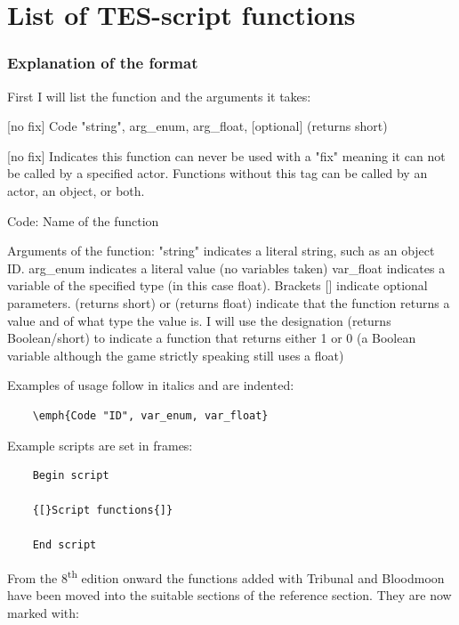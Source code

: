 \section{List of TES-script functions}

\hypertarget{explanation-of-the-format}{%
\subsubsection{Explanation of the
format}\label{explanation-of-the-format}}

First I will list the function and the arguments it takes:

	{[}no fix{]} Code "string", arg\_enum, arg\_float, {[}optional{]}
	(returns short)

{[}no fix{]} Indicates this function can never be used with a "fix"
meaning it can not be called by a specified actor. Functions without
this tag can be called by an actor, an object, or both.

Code: Name of the function

Arguments of the function: "string" indicates a literal string, such as
an object ID. arg\_enum indicates a literal value (no variables taken)
var\_float indicates a variable of the specified type (in this case
float). Brackets {[}{]} indicate optional parameters. (returns short) or
(returns float) indicate that the function returns a value and of what
type the value is. I will use the designation (returns Boolean/short) to
indicate a function that returns either 1 or 0 (a Boolean variable
although the game strictly speaking still uses a float)

Examples of usage follow in italics and are indented:

\begin{lstlisting}
	\emph{Code "ID", var_enum, var_float}
\end{lstlisting}
	
Example scripts are set in frames:

\begin{lstlisting}	
	Begin script
	
	{[}Script functions{]}
	
	End script
\end{lstlisting}

From the 8\textsuperscript{th} edition onward the functions added with
Tribunal and Bloodmoon have been moved into the suitable sections of the
reference section. They are now marked with:

